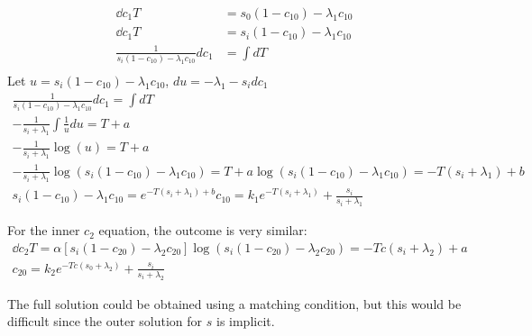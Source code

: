 \documentclass{X:/Documents/Coding/Latex/myassignment}
\begin{document}
\begin{enumerate}
\begin{enumerate}
		\begin{align*}
			\dd{c_1}T &= s_0(1-c_{10}) - \lambda_1 c_{10}\\
			\dd{c_1}{T} &= s_i (1-c_{10}) - \lambda_1 c_{10}\\
			\frac{1}{s_i (1-c_{10}) - \lambda_1 c_{10}} dc_1 &= \int dT\\
		\end{align*}
		Let $u = s_i (1-c_{10}) - \lambda_1 c_{10}$, $du = -\lambda_1 - s_i dc_1$
		\begin{align*}
			\frac{1}{s_i (1-c_{10}) - \lambda_1 c_{10}} dc_1 = \int dT\\
			-\frac{1}{s_i + \lambda_1} \int \frac{1}{u} du = T + a\\
			-\frac{1}{s_i + \lambda_1} \log(u) = T+a\\
			-\frac{1}{s_i + \lambda_1} \log(s_i (1-c_{10}) - \lambda_1 c_{10}) = T+a
			\log(s_i (1-c_{10}) - \lambda_1 c_{10})=-T(s_i + \lambda_1) + b\\
			s_i (1-c_{10}) - \lambda_1 c_{10} = e^{-T(s_i + \lambda_1) + b}
			c_{10} = k_1e^{-T(s_i + \lambda_1)} + \frac{s_i}{s_i + \lambda_1}
		\end{align*}

		For the inner $c_2$ equation, the outcome is very similar:
		\begin{align*}
			\dd{c_2}T = \alpha \left[ s_i (1- c_{20}) - \lambda_2 c_{20}\right]
			\log(s_i(1-c_{20}) - \lambda_2 c_{20}) = -Tc(s_i + \lambda_2)+ a\\
			c_{20} = k_2e^{-Tc(s_0 +\lambda_2)} + \frac{s_i}{s_i + \lambda_2}
		\end{align*}







		The full solution could be obtained using a matching condition, but this would be difficult since the outer solution for $s$ is implicit.


	\end{enumerate}

\end{enumerate}

	
\end{document}
